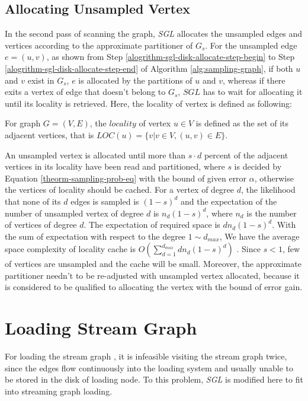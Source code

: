 \documentclass{sig-alternate-2013}
\begin{document}
\subsection{Allocating Unsampled Vertex}
In the second pass of scanning the graph, \textit{SGL} allocates the unsampled edges and vertices according to the approximate partitioner of $G_s$. For the unsampled edge $e=(u, v)$, as shown from Step \ref{alogrithm-sgl-disk-allocate-step-begin} to Step \ref{alogrithm-sgl-disk-allocate-step-end} of Algorithm \ref{alg:sampling-graph}, if both $u$ and $v$ exist in $G_s$, $e$ is allocated by the partitions of $u$ and $v$, whereas if there exits a vertex of edge that doesn't belong to $G_s$, $SGL$ has to wait for allocating it until its locality is retrieved. Here, the locality of vertex is defined as following:

\begin{definition}\label{def-locality}
For graph $G=(V, E)$, the $locality$ of vertex $u\in V$ is defined as the set of its adjacent  vertices, that is $LOC(u)=\{v | v\in V, (u,v)\in E \}$.
\end{definition}

An unsampled vertex is allocated until more than $s \cdot d$ percent of the adjacent vertices in its locality have been read and partitioned, where $s$ is decided by Equation \ref{theorm-sampling-prob-eq} with the bound of given error $\alpha$, otherwise  the vertices of locality should be cached.
For a vertex of degree $d$, the likelihood that none of its $d$ edges is sampled is  $(1-s)^d$ and the expectation of the number of unsampled vertex of degree $d$ is $n_d (1-s)^d$, where $n_d$ is the number of vertices of degree $d$. The expectation of required space is $d n_d (1-s)^d$.
With the sum of expectation with respect to the degree $1\sim d_{max}$, We have the average space complexity of locality cache is $O(\sum_{d=1}^{d_{max}} {d n_d(1-s)^d})$ .
Since $s<1$, few of vertices are unsampled and the cache will be small.
Moreover,  the approximate partitioner needn't to be re-adjusted with unsampled vertex allocated, because it is considered to be qualified to allocating the vertex with the bound of error gain.

\section{ Loading Stream Graph }
For loading the stream graph , it is infeasible visiting the stream graph twice, since the edges flow continuously into the loading system and usually unable to be stored in the disk of loading node. To this problem, \textit{SGL} is modified here to fit into streaming graph loading.
\end{document}
